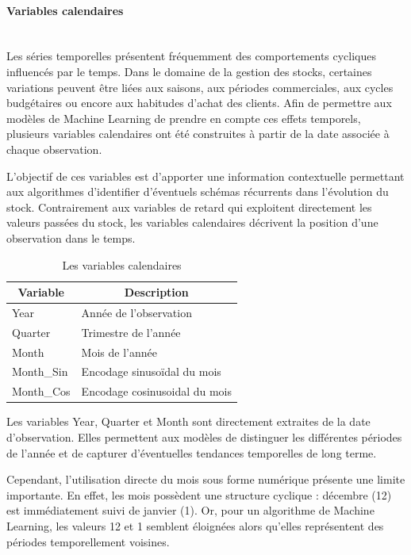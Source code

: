\paragraph{Variables calendaires}\mbox{}\\
Les séries temporelles présentent fréquemment des comportements cycliques influencés par le temps. Dans le domaine de la gestion des stocks, certaines variations peuvent être liées aux saisons, aux périodes commerciales, aux cycles budgétaires ou encore aux habitudes d'achat des clients. Afin de permettre aux modèles de Machine Learning de prendre en compte ces effets temporels, plusieurs variables calendaires ont été construites à partir de la date associée à chaque observation.
 
L'objectif de ces variables est d'apporter une information contextuelle permettant aux algorithmes d'identifier d'éventuels schémas récurrents dans l'évolution du stock. Contrairement aux variables de retard qui exploitent directement les valeurs passées du stock, les variables calendaires décrivent la position d'une observation dans le temps.
 
\begin{table}[H]
\centering
\caption{Les variables calendaires}
\label{tab:ch4:variables_calendaires}
\small
\begin{tabular}{|p{3cm}|p{6cm}|}
\hline
\multicolumn{1}{|c|}{\textbf{Variable}} & \multicolumn{1}{c|}{\textbf{Description}} \\
\hline
Year & Année de l'observation \\
\hline
Quarter & Trimestre de l'année \\
\hline
Month & Mois de l'année \\
\hline
Month\_Sin & Encodage sinusoïdal du mois \\
\hline
Month\_Cos & Encodage cosinusoidal du mois \\
\hline
\end{tabular}
\end{table}
 
Les variables Year, Quarter et Month sont directement extraites de la date d'observation. Elles permettent aux modèles de distinguer les différentes périodes de l'année et de capturer d'éventuelles tendances temporelles de long terme.
 
Cependant, l'utilisation directe du mois sous forme numérique présente une limite importante. En effet, les mois possèdent une structure cyclique : décembre (12) est immédiatement suivi de janvier (1). Or, pour un algorithme de Machine Learning, les valeurs 12 et 1 semblent éloignées alors qu'elles représentent des périodes temporellement voisines.
 
